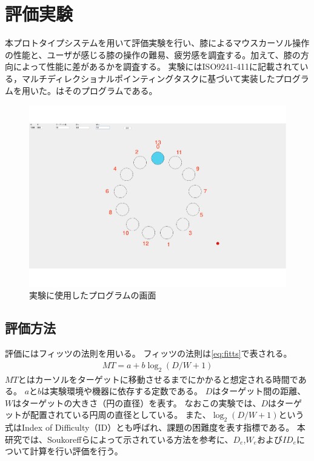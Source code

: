 \documentclass[submit, techrep]{ipsj}
\begin{document}
\section{評価実験}
本プロトタイプシステムを用いて評価実験を行い、膝によるマウスカーソル操作の性能と、ユーザが感じる膝の操作の難易、疲労感を調査する。加えて、膝の方向によって性能に差があるかを調査する。
実験にはISO9241-411\cite{9241411}に記載されている，マルチディレクショナルポインティングタスクに基づいて実装したプログラムを用いた。はそのプログラムである。
\begin{figure}[tb]
	\begin{center}
		\includegraphics[angle = 270, width = 1.0\hsize]{./figures/1.pdf}
	\end{center}
	\caption{実験に使用したプログラムの画面}
	\label{img:mdpt}
\end{figure}
\subsection{評価方法}
評価にはフィッツの法則\cite{fitts}を用いる。
フィッツの法則は\ref{eq:fitts}で表される。
\begin{eqnarray}
	MT = a + b\log_2{(D/W + 1)}
	\label{eq:fitts}
\end{eqnarray}
$MT$とはカーソルをターゲットに移動させるまでにかかると想定される時間である。
$a$と$b$は実験環境や機器に依存する定数である。
$D$はターゲット間の距離、$W$はターゲットの大きさ（円の直径）を表す。
なおこの実験では、$D$はターゲットが配置されている円周の直径としている。
また、$\log_2{(D/W + 1)}$という式はIndex of Difficulty（ID）とも呼ばれ、課題の困難度を表す指標である。
本研究では、Soukoreffら\cite{Soukoreff:2004:TSP:1056153.1056155}によって示されている方法を参考に、$D_e$,$W_e$および$ID_e$について計算を行い評価を行う。
\end{document}
